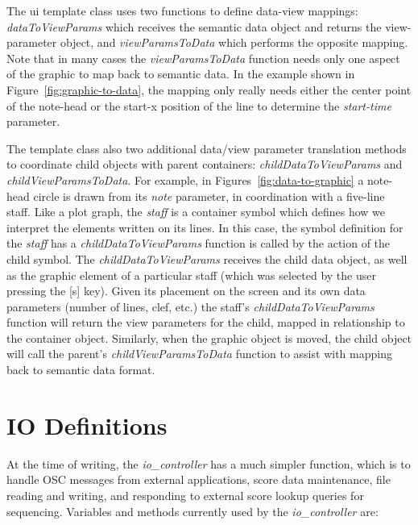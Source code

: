 \documentclass{article}
\def\iocontroller{\textit{io\_controller}\xspace}
\begin{document}
The ui template class uses two functions to define data-view mappings: \textit{dataToViewParams} which receives the semantic data object and returns the view-parameter object, and \textit{viewParamsToData} which performs the opposite mapping.
Note that in many cases the \textit{viewParamsToData} function needs only one aspect of the graphic to map back to semantic data. In the example shown in Figure~\ref{fig:graphic-to-data}, the mapping only really needs either the center point of the note-head or the start-x position of the line to determine the \textit{start-time} parameter.

The template class also two additional data/view parameter translation methods to coordinate child objects with parent containers: \textit{childDataToViewParams} and \textit{childViewParamsToData}.
For example, in Figures~\ref{fig:data-to-graphic} a note-head circle is drawn from its \textit{note} parameter, in coordination with a five-line staff.
Like a plot graph, the \textit{staff} is a container symbol which defines how we interpret the elements written on its lines. 
In this case, the symbol definition for the \textit{staff} has a \textit{childDataToViewParams} function is called by the action of the child symbol. 
The \textit{childDataToViewParams} receives the child data object, as well as the graphic element of a particular staff (which was selected by the user pressing the [s] key). Given its placement on the screen and its own data parameters (number of lines, clef, etc.) the staff's \textit{childDataToViewParams} function will return the view parameters for the child, mapped in relationship to the container object.
Similarly, when the graphic object is moved, the child object will call the parent's \textit{childViewParamsToData} function to assist with mapping back to semantic data format.


\section{IO Definitions}\label{sec:io_definitions}

At the time of writing, the \iocontroller has a much simpler function, which is to handle OSC messages from external applications, score data maintenance, file reading and writing, and responding to external score lookup queries for sequencing.
Variables and methods currently used by the \iocontroller are:
\end{document}
